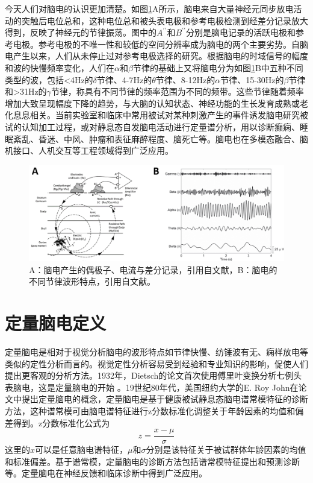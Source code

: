 今天人们对脑电的认识更加清楚。如图\ref{1:record}A所示，脑电来自大量神经元同步放电活动的突触后电位总和，这种电位总和被头表电极和参考电极检测到经差分记录放大得到，反映了神经元的节律振荡。图中的$A^{\prime\prime}$和$B^{\prime\prime}$分别是脑电记录的活跃电极和参考电极。参考电极的不唯一性和较低的空间分辨率成为脑电的两个主要劣势。自脑电产生以来，人们从未停止过对参考电极选择的研究。根据脑电的时域信号的幅度和波的快慢频率变化，人们在$\alpha$和$\beta$节律的基础上又将脑电分为如图\ref{1:record}B中五种不同类型的波，包括<4Hz的$\delta$节律、4-7Hz的$\theta$节律、8-12Hz的$\alpha$节律、15-30Hz的$\beta$节律和>31Hz的$\gamma$节律，称具有不同节律的频率范围为不同的频带。这些节律随着频率增加大致呈现幅度下降的趋势，与大脑的认知状态、神经功能的生长发育成熟或老化息息相关。当前实验室和临床中常用被试对某种刺激产生的事件诱发脑电研究被试的认知加工过程，或对静息态自发脑电活动进行定量谱分析，用以诊断癫痫、睡眠紊乱、昏迷、中风、肿瘤和表征麻醉程度、脑死亡等。脑电也在多模态融合、脑机接口、人机交互等工程领域得到广泛应用。
\begin{figure}[!h]
	\includegraphics[width=15cm]{pic/xulun/record.png}
	\caption{A：脑电产生的偶极子、电流与差分记录，引用自文献，B：脑电的不同节律波形特点，引用自文献。}
	\label{1:record}
\end{figure}


\section{定量脑电定义}
定量脑电是相对于视觉分析脑电的波形特点如节律快慢、纺锤波有无、痫样放电等类似的定性分析而言的。视觉定性分析容易受到经验和专业知识的影响，促使人们提出更客观的分析方法。1932年，Dietsch的论文\cite{Dietsch1932}首次使用傅里叶变换分析七例头表脑电，这是定量脑电的开始
。19世纪80年代，美国纽约大学的E. Roy John在论文\cite{john1977neurometrics,john1980developmental}中提出定量脑电的概念，定量脑电是基于健康被试静息态脑电谱常模特征的诊断方法，这种谱常模可由脑电谱特征进行z分数标准化调整关于年龄因素的均值和偏差得到。z分数标准化公式为
\begin{equation}
z=\frac{x-\mu}{\sigma}
\end{equation}
这里的$x$可以是任意脑电谱特征，$\mu$和$\sigma$分别是该特征关于被试群体年龄因素的均值和标准偏差。基于谱常模，定量脑电的诊断方法包括谱常模特征提出和预测诊断等。定量脑电在神经反馈和临床诊断中得到广泛应用。

